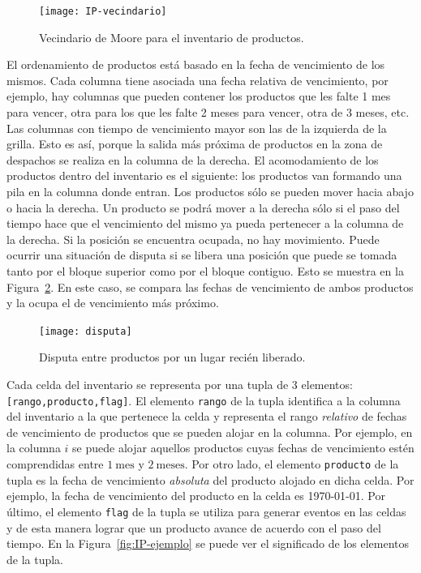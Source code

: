 \documentclass[10pt]{article}
\begin{document}
\begin{figure}[h] 
  \centering 
  \texttt{[image: IP-vecindario]} 
  \caption{Vecindario de Moore para el inventario de productos.} 
  \label{fig:IP-vecindario} 
\end{figure}
\FloatBarrier

 El ordenamiento de productos está basado en la fecha de vencimiento de los mismos. Cada columna tiene asociada una fecha relativa de vencimiento, por ejemplo, hay columnas que pueden contener los productos que les falte 1 mes para vencer, otra para los que les falte 2 meses para vencer, otra de 3 meses, etc. Las columnas con tiempo de vencimiento mayor son las de la izquierda de la grilla. Esto es así, porque la salida más próxima de productos en la zona de despachos se realiza en la columna de la derecha.
El acomodamiento de los productos dentro del inventario es el siguiente: los productos van formando una pila en la columna donde entran. Los productos sólo se pueden mover hacia abajo o hacia la derecha. Un producto se podrá mover a la derecha sólo si el paso del tiempo hace que el vencimiento del mismo ya pueda pertenecer a la columna de la derecha. Si la posición se encuentra ocupada, no hay movimiento.
Puede ocurrir una situación de disputa si se libera una posición que puede se tomada tanto por el bloque superior como por el bloque contiguo. Esto se muestra en la Figura~\ref{fig:IP-disputa}. En este caso, se compara las fechas de vencimiento de ambos productos y la ocupa el de vencimiento más próximo.

\begin{figure}[h] 
	\centering 
	\texttt{[image: disputa]} 
	\caption{Disputa entre productos por un lugar recién liberado.} 
	\label{fig:IP-disputa} 
\end{figure}
\FloatBarrier

Cada celda del inventario se representa por una tupla de 3 elementos: \texttt{[rango,producto,flag]}. El elemento \texttt{rango} de la tupla identifica a la columna del inventario a la que pertenece la celda y representa el rango \textit{relativo} de fechas de vencimiento de productos que se pueden alojar en la columna. Por ejemplo, en la columna $i$ se puede alojar aquellos productos cuyas fechas de vencimiento estén comprendidas entre $1~\textrm{mes}$ y $2~\textrm{meses}$. Por otro lado, el elemento \texttt{producto} de la tupla es la fecha de vencimiento \textit{absoluta} del producto alojado en dicha celda. Por ejemplo, la fecha de vencimiento del producto en la celda es \today. Por último, el elemento \texttt{flag} de la tupla se utiliza para generar eventos en las celdas y de esta manera lograr que un producto avance de acuerdo con el paso del tiempo. En la Figura~\ref{fig:IP-ejemplo} se puede ver el significado de los elementos de la tupla.
\end{document}
